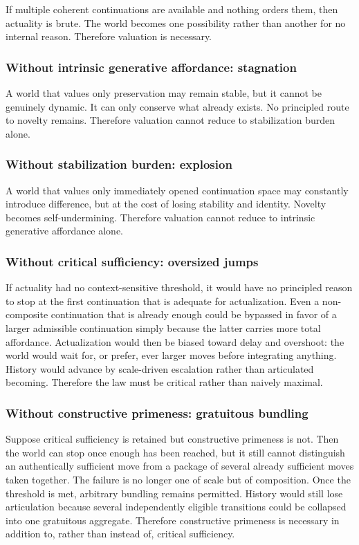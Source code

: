 \documentclass[11pt]{article}
\theoremstyle{foundation}
\begin{document}
If multiple coherent continuations are available and nothing orders them, then actuality is brute. The world becomes one possibility rather than another for no internal reason. Therefore valuation is necessary.

\subsubsection{Without intrinsic generative affordance: stagnation}

A world that values only preservation may remain stable, but it cannot be genuinely dynamic. It can only conserve what already exists. No principled route to novelty remains. Therefore valuation cannot reduce to stabilization burden alone.

\subsubsection{Without stabilization burden: explosion}

A world that values only immediately opened continuation space may constantly introduce difference, but at the cost of losing stability and identity. Novelty becomes self-undermining. Therefore valuation cannot reduce to intrinsic generative affordance alone.

\subsubsection{Without critical sufficiency: oversized jumps}

If actuality had no context-sensitive threshold, it would have no principled reason to stop at the first continuation that is adequate for actualization. Even a non-composite continuation that is already enough could be bypassed in favor of a larger admissible continuation simply because the latter carries more total affordance. Actualization would then be biased toward delay and overshoot: the world would wait for, or prefer, ever larger moves before integrating anything. History would advance by scale-driven escalation rather than articulated becoming. Therefore the law must be critical rather than naively maximal.

\subsubsection{Without constructive primeness: gratuitous bundling}

Suppose critical sufficiency is retained but constructive primeness is not. Then the world can stop once enough has been reached, but it still cannot distinguish an authentically sufficient move from a package of several already sufficient moves taken together. The failure is no longer one of scale but of composition. Once the threshold is met, arbitrary bundling remains permitted. History would still lose articulation because several independently eligible transitions could be collapsed into one gratuitous aggregate. Therefore constructive primeness is necessary in addition to, rather than instead of, critical sufficiency.
\end{document}
